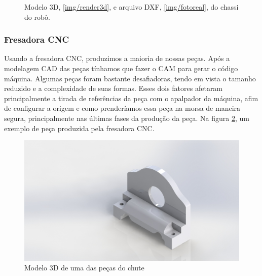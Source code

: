 \documentclass[conference]{IEEEtran}
\begin{document}
\begin{figure}[thpb]
    \caption{Modelo 3D, \ref{img/render3d}, e arquivo DXF, \ref{img/fotoreal}, do chassi do robô.}
    \label{fig:corte_dagua}
\end{figure}


\subsubsection {Fresadora CNC}

Usando a fresadora CNC, produzimos a maioria de nossas peças. Após a modelagem CAD das peças tínhamos que fazer o CAM para gerar o código máquina. Algumas peças foram bastante desafiadoras, tendo em vista o tamanho reduzido e a complexidade de suas formas. Esses dois fatores afetaram principalmente a tirada de referências da peça com o apalpador da máquina, afim de configurar a origem e como prenderíamos essa peça na morsa de maneira segura, principalmente nas últimas fases da produção da peça. Na figura \ref{fig:real_and_model}, um exemplo de peça produzida pela fresadora CNC.

\begin{figure}[thpb]	
	\centering
	\includegraphics[width=0.9\linewidth]{img/mec6}
	\caption{Modelo 3D de uma das peças do chute}
	\label{fig:real_and_model}
\end{figure}
\end{document}
